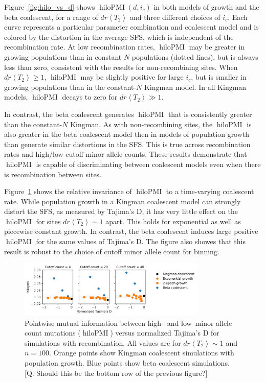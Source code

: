 \documentclass[11pt, letterpaper]{article}   	%
\newcommand{\Fig}[1]{Figure~\ref{#1}}
\newcommand{\E}[1]{\left< #1 \right>}
\DeclareMathOperator{\hilopmi}{hiloPMI}
\begin{document}
\Fig{fig:hilo_vs_d} shows $\hilopmi(d,i_c)$ in both models of growth and the beta coalescent, for a range of $d r \E{T_2}$ and three different choices of $i_c$.
Each curve represents a particular parameter combination and coalescent model and is colored by the distortion in the average SFS, which is independent of the recombination rate.
At low recombination rates, $\hilopmi$ may be greater in growing populations than in constant-$N$ populations (dotted lines), but is always less than zero, consistent with the results for non-recombining sites.
When $d r \E{T_2}\geq 1$, $\hilopmi$ may be slightly positive for large $i_c$, but is smaller in growing populations than in the constant-$N$ Kingman model.
In all Kingman models, $\hilopmi$ decays to zero for $d r \E{T_2}\gg 1$.

In contrast, the beta coalescent generates $\hilopmi$ that is consistently greater than the constant-$N$ Kingman.
As with non-recombining sites, the $\hilopmi$ is also greater in the beta coalescent model then in models of population growth than generate similar distortions in the SFS.
This is true across recombination rates and high/low cutoff minor allele counts.
These results demonstrate that $\hilopmi$ is capable of discriminating between coalescent models even when there is recombination between sites.

\Fig{fig:hilo_vs_tajD} shows the relative invariance of $\hilopmi$ to a time-varying coalescent rate.
While population growth in a Kingman coalescent model can strongly distort the SFS, as measured by Tajima's D, it has very little effect on the $\hilopmi$ for sites $d r \E{T_2} \sim 1$ apart.
This holds for exponential as well as piecewise constant growth.
In contrast, the beta coalescent induces large positive $\hilopmi$ for the same values of Tajima's D.
The figure also showes that this result is robust to the choice of cutoff minor allele count for binning.

\begin{figure}
\centering
\includegraphics[width=0.8\textwidth]{figures/hilopmi_vs_tajimasD_recombination.pdf}
\caption{Pointwise mutual information between high-- and low--minor allele count mutations ($\hilopmi$) versus normalized Tajima's D for simulations with recombination. All values are for $d r \E{T_2} \sim 1$ and $n=100$. Orange points show Kingman coalescent simulations with population growth. Blue points show beta coalescent simulations. [Q: Should this be the bottom row of the previous figure?] \label{fig:hilo_vs_tajD}}
\end{figure}
\end{document}
